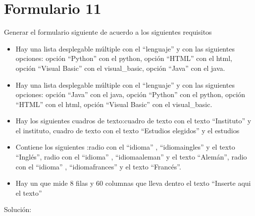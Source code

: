 \documentclass[letterpaper,10pt,spanish]{sphinxmanual}
\begin{document}
\section{Formulario 11}
\label{ejercicios/formularios/anexo_formularios:formulario-11}
Generar el formulario siguiente de acuerdo a los siguientes requisitos
\begin{itemize}
\item {} 
Hay una lista desplegable múltiple con el  ``lenguaje'' y con las siguientes opciones: opción ``Python'' con el  python, opción ``HTML'' con el  html, opción ``Visual Basic'' con el  visual\_basic, opción ``Java'' con el  java.

\item {} 
Hay una lista desplegable múltiple con el  ``lenguaje'' y con las siguientes opciones: opción ``Java'' con el  java, opción ``Python'' con el  python, opción ``HTML'' con el  html, opción ``Visual Basic'' con el  visual\_basic.

\item {} 
Hay los siguientes cuadros de texto:cuadro de texto con el texto ``Instituto'' y el  instituto, cuadro de texto con el texto ``Estudios elegidos'' y el  estudios

\item {} 
Contiene los siguientes :radio con el   ``idioma'' ,   ``idiomaingles''  y el texto ``Inglés'', radio con el   ``idioma'' ,   ``idiomaaleman''  y el texto ``Alemán'', radio con el   ``idioma'' ,   ``idiomafrances''  y el texto ``Francés''.

\item {} 
Hay un  que mide 8 filas y 60 columnas que lleva dentro el texto ``Inserte aqui el texto''

\end{itemize}


Solución:
\end{document}
